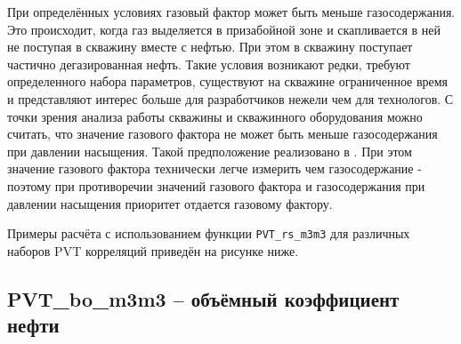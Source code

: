 При определённых условиях газовый фактор может быть меньше газосодержания. Это происходит, когда газ выделяется в призабойной зоне и скапливается в ней не поступая в скважину вместе с нефтью. При этом в скважину поступает частично дегазированная нефть. Такие условия возникают редки, требуют определенного набора параметров, существуют на скважине ограниченное время и представляют интерес больше для разработчиков нежели чем для технологов. С точки зрения анализа работы скважины и скважинного оборудования можно считать, что значение газового фактора не может быть меньше газосодержания при давлении насыщения. Такой предположение реализовано в \unf{}. При этом значение газового фактора технически легче измерить чем газосодержание - поэтому при противоречии значений газового фактора и газосодержания при давлении насыщения приоритет отдается газовому фактору. 


Примеры расчёта с использованием функции \texttt{PVT_rs_m3m3} для различных наборов PVT корреляций приведён на рисунке ниже.

\newcommand{\RsDataFile}{data/Rs_P_data.txt}


\subsection{PVT\_bo\_m3m3 – объёмный коэффициент нефти}

